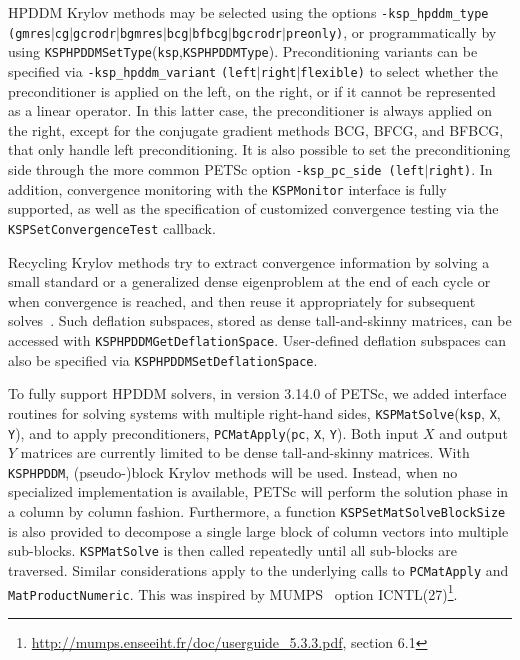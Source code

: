 \documentclass[3p,11pt]{elsarticle}
\newcommand{\pk}[1]{\texttt{#1}}
\begin{document}
HPDDM Krylov methods may be selected using the %
options \pk{-ksp\_hpddm\_type}
\pk{(gmres$|$cg$|$gcrodr$|$\linebreak bgmres$|$bcg$|$bfbcg$|$bgcrodr$|$preonly)}, or programmatically 
by using \pk{KSPHPDDMSetType}(\pk{ksp},\linebreak \pk{KSPHPDDMType}).
Preconditioning variants can be specified via
\pk{-ksp\_hpddm\_variant} \pk{(left$|$right$|$\linebreak flexible)} to select whether the
preconditioner is applied on the left, on the right, or if it cannot be
represented as a linear operator. In this latter case, the preconditioner is
always applied on the right, except for the conjugate gradient methods BCG, 
BFCG, and BFBCG, that only handle left preconditioning.  It is also
possible to set the preconditioning side through the more common PETSc option
\pk{-ksp\_pc\_side (left$|$right)}.  In addition, convergence monitoring with the
\pk{KSPMonitor} interface is fully supported, as well as the specification of
customized convergence testing via the \pk{KSPSetConvergenceTest} callback.

Recycling Krylov methods try to
extract convergence information by solving a small standard or a generalized
dense eigenproblem at the end of each cycle or when convergence is reached, and
then reuse it appropriately for subsequent
solves~\cite{saad2000deflated,stathopoulos2009deflation,soodhalter2014krylov}.
Such deflation subspaces, stored as dense tall-and-skinny matrices, can be accessed with \pk{KSPHPDDMGetDeflationSpace}. User-defined deflation subspaces can also be specified via \pk{KSPHPDDMSetDeflationSpace}.

To fully support HPDDM solvers, in version 3.14.0 of PETSc, we added interface routines
for solving systems with multiple right-hand sides, \pk{KSPMatSolve}(\pk{ksp}, \pk{X}, \pk{Y}),
and to apply preconditioners, \pk{PCMatApply}(\pk{pc}, \pk{X}, \pk{Y}).
Both input $X$ and output $Y$ matrices are currently limited to be dense tall-and-skinny matrices.
With \pk{KSPHPDDM}, \mbox{(pseudo-)block} Krylov methods will be used. Instead, when no specialized implementation
is available, PETSc will perform the solution phase
in a column by column fashion.
Furthermore, a function \pk{KSPSetMatSolveBlockSize} is also provided to
decompose a single large block of column vectors into multiple sub-blocks.
\pk{KSPMatSolve} is then called repeatedly until all sub-blocks are traversed.
Similar considerations apply to the underlying calls to \pk{PCMatApply} and \pk{MatProductNumeric}.
This was inspired by MUMPS~\cite{amestoy2001fully} option
ICNTL(27)\footnote{\url{http://mumps.enseeiht.fr/doc/userguide_5.3.3.pdf},
section 6.1}.
\end{document}
